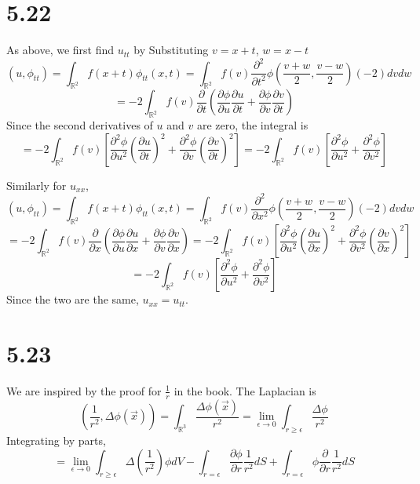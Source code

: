 \documentclass{article}
\begin{document}
\section*{5.22}
As above, we first find $u_{tt}$ by Substituting $v=x+t$, $w=x-t$
\[(u, \phi_{tt})=\int_{\mathbb{R}^2}f(x+t)\phi_{tt}(x,t)=\int_{\mathbb{R}^2}f(v)\frac{\partial^2}{\partial t^2} \phi\left(\frac{v+w}{2},\frac{v-w}{2}\right)(-2)dvdw\]
\[=-2\int_{\mathbb{R}^2}f(v)\frac{\partial}{\partial t}\left( \frac{\partial \phi}{\partial u}\frac{\partial u}{\partial t}+\frac{\partial \phi}{\partial v}\frac{\partial v}{\partial t} \right)\]
Since the second derivatives of $u$ and $v$ are zero, the integral is
\[=-2\int_{\mathbb{R}^2}f(v)\left[ \frac{\partial^2\phi}{\partial u^2}\left( \frac{\partial u}{\partial t} \right)^2+\frac{\partial^2\phi}{\partial v}\left( \frac{\partial v}{\partial t} \right)^2 \right]=-2\int_{\mathbb{R}^2}f(v)\left[ \frac{\partial^2\phi}{\partial u^2}+\frac{\partial^2\phi}{\partial v^2} \right]\]

Similarly for $u_{xx}$,
\[(u,\phi_{tt})=\int_{\mathbb{R}^2}f(x+t)\phi_{tt}(x,t)=\int_{\mathbb{R}^2}f(v)\frac{\partial^2}{\partial x^2}\phi\left(\frac{v+w}{2},\frac{v-w}{2}\right)(-2)dvdw\]
\[=-2\int_{\mathbb{R}^2}f(v)\frac{\partial}{\partial x}\left(\frac{\partial \phi}{\partial u}\frac{\partial u}{\partial x}+\frac{\partial \phi}{\partial v}\frac{\partial v}{\partial x}  \right)=-2\int_{\mathbb{R}^2}f(v)\left[ \frac{\partial^2\phi}{\partial u^2}\left( \frac{\partial u}{\partial x} \right)^2+\frac{\partial^2 \phi}{\partial v^2}\left( \frac{\partial v}{\partial x} \right)^2 \right]\]
\[=-2\int_{\mathbb{R}^2}f(v)\left[  \frac{\partial^2\phi}{\partial u^2}+\frac{\partial^2\phi}{\partial v^2}\right]\]
Since the two are the same, $u_{xx}=u_{tt}$.

\section*{5.23}
We are inspired by the proof for $\frac{1}{r}$ in the book. The Laplacian is
\[\left(\frac{1}{r^2},\Delta\phi(\vec{x})\right)=\int_{\mathbb{R}^3}\frac{\Delta\phi(\vec{x})}{r^2}=\lim_{\epsilon\to 0}\int_{r\geq\epsilon}\frac{\Delta\phi}{r^2}\]
Integrating by parts,
\[=\lim_{\epsilon\to 0}\int_{r\geq \epsilon}\Delta\left( \frac{1}{r^2}\right)\phi dV-\int_{r=\epsilon}\frac{\partial \phi}{\partial r}\frac{1}{r^2}dS+\int_{r=\epsilon}\phi\frac{\partial }{\partial r}\frac{1}{r^2} dS\]
\end{document}
